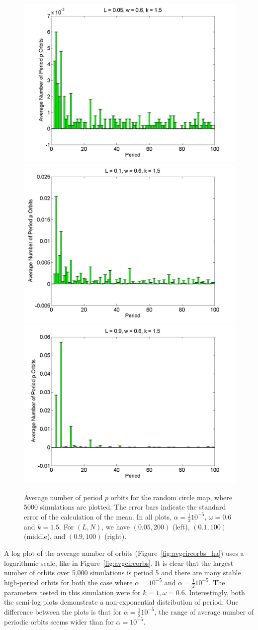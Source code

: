 \begin{figure}[H]\linespread{1}
\caption[Average number of period $p$ orbits for the random circle
map (uniform distribution), for $\alpha=\frac{1}{2}10^{-5}$, $\omega=0.6$ and $k=1.5$]{Average number of period $p$ orbits for the random circle
map, where 5000 simulations are plotted. The error bars indicate
the standard error of the calculation of the mean. In all plots,
$\alpha = \frac{1}{2}10^{-5}$, $\omega=0.6$ and $k=1.5$. For $(L,N)$,
we have $(0.05, 200)$ (left), $(0.1, 100)$
(middle), and $(0.9, 100)$ (right).}\label{fig:rcirchist_u_ha2}
	\begin{center}	\includegraphics[width=.33\textwidth]{figs/rcirc_hist_u_halfa_L_005_w_06_k_15_sims_5000.png}\hfill
\includegraphics[width=.33\textwidth]{figs/rcirc_hist_u_halfa_L_01_w_06_k_15_sims_5000.png}\hfill
\includegraphics[width=.33\textwidth]{figs/rcirc_hist_u_halfa_L_09_w_06_k_15_sims_5000.png}
	\end{center}
\end{figure}

A log plot of the average number of orbits
(Figure~\ref{fig:avgcircorbs_ha}) uses a logarithmic scale, like in Figure~\ref{fig:avgcircorbs}. It is clear
that the largest number of orbits over 5,000
simulations is period 5 and there are many stable high-period orbits for both the case where $\alpha = 10^{-5}$ and $\alpha=\frac{1}{2}10^{-5}$. The parameters tested in this simulation were
for $k=1, \omega=0.6$. Interestingly, both the semi-log plots
demonstrate a non-exponential distribution of period. One difference
between the plots is that for $\alpha=\frac{1}{2}10^{-5}$, the range
of average number of periodic orbits seems wider than for $\alpha=10^{-5}$.

